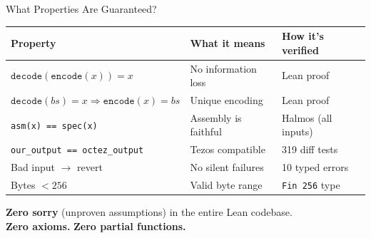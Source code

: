 \documentclass[aspectratio=169,10pt]{beamer}
\begin{document}
\begin{frame}{What Properties Are Guaranteed?}

\begin{center}
\renewcommand{\arraystretch}{1.3}
\begin{tabular}{@{}lll@{}}
\toprule
\textbf{Property} & \textbf{What it means} & \textbf{How it's verified} \\
\midrule
$\texttt{decode}(\texttt{encode}(x)) = x$ & No information loss & Lean proof \\
$\texttt{decode}(bs) = x \Rightarrow \texttt{encode}(x) = bs$ & Unique encoding & Lean proof \\
\texttt{asm(x) == spec(x)} & Assembly is faithful & Halmos (all inputs) \\
\texttt{our\_output == octez\_output} & Tezos compatible & 319 diff tests \\
Bad input $\to$ revert & No silent failures & 10 typed errors \\
Bytes $< 256$ & Valid byte range & \texttt{Fin 256} type \\
\bottomrule
\end{tabular}
\end{center}

\bigskip
\begin{center}
\textbf{Zero sorry} (unproven assumptions) in the entire Lean codebase.\\
\textbf{Zero axioms.} \textbf{Zero partial functions.}
\end{center}
\end{frame}
\end{document}
